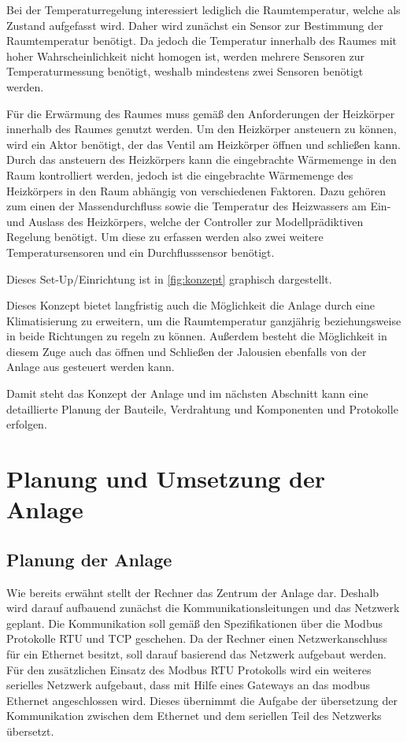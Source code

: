 Bei der Temperaturregelung interessiert lediglich die Raumtemperatur, welche als Zustand aufgefasst wird. Daher wird zunächst ein Sensor zur Bestimmung der Raumtemperatur benötigt. Da jedoch die Temperatur innerhalb des Raumes mit hoher Wahrscheinlichkeit nicht homogen ist, werden mehrere Sensoren zur Temperaturmessung benötigt, weshalb mindestens zwei Sensoren benötigt werden.

Für die Erwärmung des Raumes muss gemäß den Anforderungen der Heizkörper innerhalb des Raumes genutzt werden. Um den Heizkörper ansteuern zu können, wird ein Aktor benötigt, der das Ventil am Heizkörper öffnen und schließen kann. 
Durch das ansteuern des Heizkörpers kann die eingebrachte Wärmemenge in den Raum kontrolliert werden, jedoch ist die eingebrachte Wärmemenge des Heizkörpers in den Raum abhängig von verschiedenen Faktoren. Dazu gehören zum einen der Massendurchfluss sowie die Temperatur des Heizwassers am Ein- und Auslass des Heizkörpers, welche der Controller zur Modellprädiktiven Regelung benötigt. Um diese zu erfassen werden also zwei weitere Temperatursensoren und ein Durchflusssensor benötigt.

Dieses Set-Up/Einrichtung ist in \ref{fig:konzept} graphisch dargestellt.

Dieses Konzept bietet langfristig auch die Möglichkeit die Anlage durch eine Klimatisierung zu erweitern, um die Raumtemperatur ganzjährig beziehungsweise in beide Richtungen zu regeln zu können. Außerdem besteht die Möglichkeit in diesem Zuge auch das öffnen und Schließen der Jalousien ebenfalls von der Anlage aus gesteuert werden kann.

Damit steht das Konzept der Anlage und im nächsten Abschnitt kann eine detaillierte Planung der Bauteile, Verdrahtung und Komponenten und Protokolle erfolgen.

\section{Planung und Umsetzung der Anlage}

\subsection{Planung der Anlage}

Wie bereits erwähnt stellt der Rechner das Zentrum der Anlage dar. Deshalb wird darauf aufbauend zunächst die Kommunikationsleitungen und das Netzwerk geplant. Die Kommunikation soll gemäß den Spezifikationen über die Modbus Protokolle RTU und TCP geschehen. Da der Rechner einen Netzwerkanschluss für ein Ethernet besitzt, soll darauf basierend das Netzwerk aufgebaut werden. Für den zusätzlichen Einsatz des Modbus RTU Protokolls wird ein weiteres serielles Netzwerk aufgebaut, dass mit Hilfe eines Gateways an das modbus Ethernet angeschlossen wird. Dieses übernimmt die Aufgabe der übersetzung der Kommunikation zwischen dem Ethernet und dem seriellen Teil des Netzwerks übersetzt.

